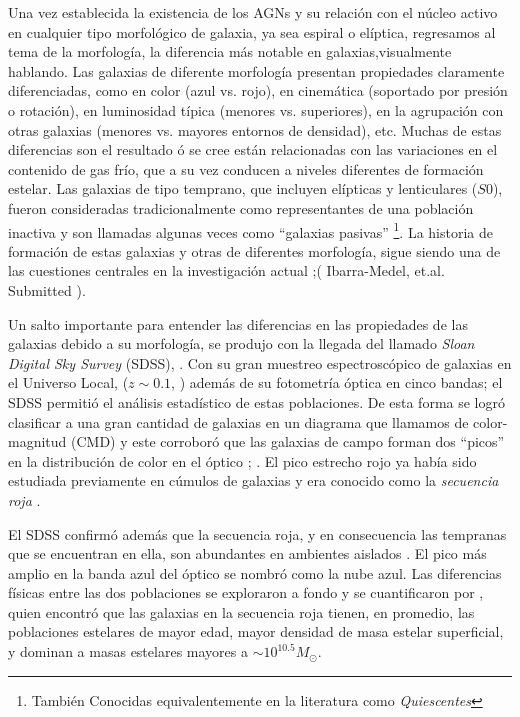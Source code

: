 Una vez establecida la existencia de los AGNs y su relación con el núcleo activo en cualquier tipo morfológico de galaxia,
 ya sea espiral o elíptica, regresamos  al tema de la morfología, la diferencia más notable en galaxias,visualmente hablando.
Las galaxias de diferente morfología presentan propiedades claramente diferenciadas, como en color (azul vs. rojo), en cinemática (soportado por presión o rotación), en luminosidad típica (menores vs. superiores),
en la agrupación con otras galaxias (menores vs. mayores entornos de densidad), etc. Muchas de estas diferencias son el resultado ó
se cree están relacionadas con las variaciones en el contenido de gas frío, que a su vez conducen a niveles diferentes de formación estelar. Las galaxias de tipo temprano, que incluyen elípticas y lenticulares ($S0$), fueron consideradas tradicionalmente como representantes de una población inactiva y son llamadas algunas veces como ``galaxias pasivas'' \footnote{También Conocidas equivalentemente en la literatura como \textsl{Quiescentes}}. La historia de formación de estas galaxias y otras de diferentes morfología, sigue siendo una de las cuestiones centrales en la investigación actual  \citep{perez2013} ;({\color{red} Ibarra-Medel, et.al. Submitted }).

\bigskip

\noindent Un salto importante para entender las diferencias en las propiedades de las galaxias debido a su morfología, se produjo con la llegada  del llamado  \textsl{Sloan Digital Sky Survey} (SDSS), \citep{york2000}. Con su gran muestreo espectroscópico de galaxias en el Universo Local, ($z \sim 0.1$, \cite{strauss2002}) además de su fotometría óptica en cinco bandas; el SDSS permitió el análisis estadístico de estas poblaciones. De esta forma se logró clasificar a una gran cantidad de galaxias en un diagrama que llamamos de color-magnitud (CMD) y este corroboró que las galaxias de campo forman dos ``picos'' en la distribución de color en el óptico \cite{strateva2001}; \cite{baldry2004}. El pico estrecho rojo ya había sido estudiada previamente en cúmulos de galaxias y era conocido como la \textsl{secuencia roja} \citep{devaucouleurs1961}.

\bigskip

\noindent El SDSS confirmó además que la secuencia roja, y en consecuencia las tempranas que se encuentran en ella, son abundantes en
ambientes aislados \citep{butcher1984}. El pico más amplio en la banda azul del óptico
se nombró como la nube azul. Las diferencias físicas entre las dos poblaciones
se exploraron a fondo y se cuantificaron por \cite{kauffmann2003}, quien encontró que las
galaxias en la secuencia roja tienen, en promedio, las poblaciones estelares de mayor edad,
mayor densidad de masa estelar superficial, y dominan a masas estelares mayores a $ \sim 10^{10.5} M_{\odot}$.


